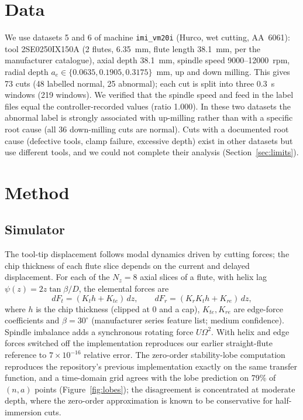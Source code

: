 \documentclass[11pt]{article}
\begin{document}
\section{Data}\label{sec:data}
We use datasets 5 and 6 of machine \texttt{imi\_vm20i} (Hurco, wet cutting, AA~6061): tool 2SE0250IX150A (2 flutes, 6.35~mm, flute length 38.1~mm, per the manufacturer catalogue), axial depth 38.1~mm, spindle speed 9000--12000~rpm, radial depth $a_e\in\{0.0635,0.1905,0.3175\}$~mm, up and down milling.
This gives 73 cuts (48 labelled normal, 25 abnormal); each cut is split into three 0.3~s windows (219 windows).
We verified that the spindle speed and feed in the label files equal the controller-recorded values (ratio 1.000).
In these two datasets the abnormal label is strongly associated with up-milling rather than with a specific root cause (all 36 down-milling cuts are normal).
Cuts with a documented root cause (defective tools, clamp failure, excessive depth) exist in other datasets but use different tools, and we could not complete their analysis (Section~\ref{sec:limits}).

\section{Method}
\subsection{Simulator}
The tool-tip displacement follows modal dynamics driven by cutting forces; the chip thickness of each flute slice depends on the current and delayed displacement.
For each of the $N_z{=}8$ axial slices of a flute, with helix lag $\psi(z)=2z\tan\beta/D$, the elemental forces are
\begin{equation}
dF_t=(K_t h+K_{te})\,dz,\qquad dF_r=(K_r K_t h+K_{re})\,dz,
\end{equation}
where $h$ is the chip thickness (clipped at 0 and a cap), $K_{te},K_{re}$ are edge-force coefficients and $\beta{=}30^\circ$ (manufacturer series feature list; medium confidence).
Spindle imbalance adds a synchronous rotating force $U\Omega^2$.
With helix and edge forces switched off the implementation reproduces our earlier straight-flute reference to $7\times10^{-16}$ relative error.
The zero-order stability-lobe computation reproduces the repository's previous implementation exactly on the same transfer function, and a time-domain grid agrees with the lobe prediction on 79\% of $(n,a)$ points (Figure~\ref{fig:lobes}); the disagreement is concentrated at moderate depth, where the zero-order approximation is known to be conservative for half-immersion cuts.
\end{document}
